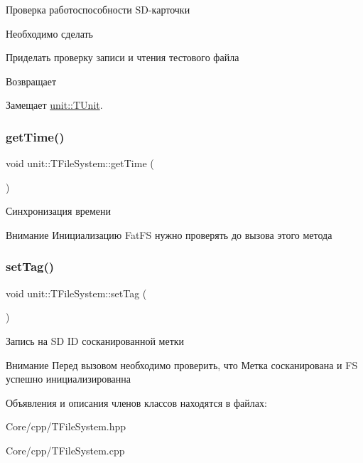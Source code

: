 Проверка работоспособности S\+D-\/карточки 

\begin{DoxyRefDesc}{Необходимо сделать}
\item[\hyperlink{todo__todo000004}{Необходимо сделать}]Приделать проверку записи и чтения тестового файла \end{DoxyRefDesc}
\begin{DoxyReturn}{Возвращает}

\end{DoxyReturn}


Замещает \hyperlink{classunit_1_1_t_unit_abdcc6daabc86cea10abc96593d9d2c2a}{unit\+::\+T\+Unit}.

\mbox{\label{classunit_1_1_t_file_system_aaf4766a6f4dcd6759e362ffc977615f5}} 
\subsubsection{\texorpdfstring{get\+Time()}{getTime()}}
{\footnotesize\ttfamily void unit\+::\+T\+File\+System\+::get\+Time (\begin{DoxyParamCaption}{ }\end{DoxyParamCaption})}



Синхронизация времени 

\begin{DoxyAttention}{Внимание}
Инициализацию Fat\+FS нужно проверять до вызова этого метода 
\end{DoxyAttention}
\mbox{\label{classunit_1_1_t_file_system_a79523b2edca3574ec6254af671f28256}} 
\subsubsection{\texorpdfstring{set\+Tag()}{setTag()}}
{\footnotesize\ttfamily void unit\+::\+T\+File\+System\+::set\+Tag (\begin{DoxyParamCaption}{ }\end{DoxyParamCaption})}



Запись на SD ID сосканированной метки 

\begin{DoxyAttention}{Внимание}
Перед вызовом необходимо проверить, что Метка сосканирована и FS успешно инициализированна 
\end{DoxyAttention}


Объявления и описания членов классов находятся в файлах\+:\begin{DoxyCompactItemize}
\item 
Core/cpp/T\+File\+System.\+hpp\item 
Core/cpp/T\+File\+System.\+cpp\end{DoxyCompactItemize}
